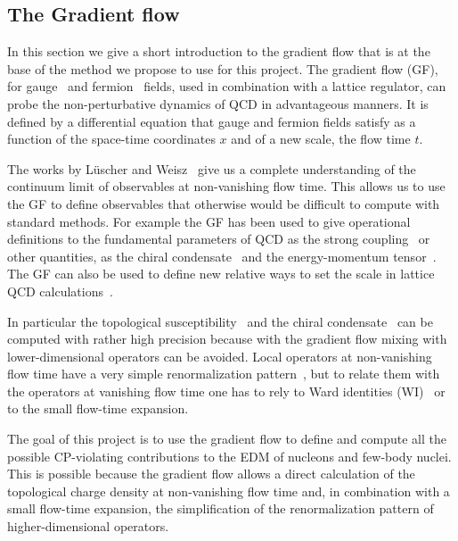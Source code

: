 \documentclass[aps,prc,twocolumn,showpacs,floatfix,nofootinbib,preprintnumbers,superscriptaddress,amsmath,amssymb]{revtex4-1}
\begin{document}
\subsection{The Gradient flow}

In this section we give a short introduction to the gradient flow that is at the base of the
method we propose to use for this project.
The gradient flow (GF), for gauge~\cite{Luscher:2010iy} 
and fermion~\cite{Luscher:2013cpa} fields, used in combination with a lattice regulator, 
can probe the non-perturbative dynamics of QCD
in advantageous manners.
It is defined by a differential equation that gauge and fermion
fields satisfy as a function of the space-time coordinates $x$ and of a new
scale, the flow time $t$.

The works by L\"uscher and Weisz~\cite{Luscher:2010iy,Luscher:2011bx,Luscher:2013cpa}
give us a complete understanding of the continuum limit
of observables at non-vanishing flow time. This allows us to use the GF
to define observables that otherwise would be difficult
to compute with standard methods.
For example the GF has been used to give operational definitions to the
fundamental parameters of QCD as the strong coupling~\cite{Luscher:2010iy,Fodor:2012td,Fritzsch:2013je}
or other quantities, as the chiral condensate~\cite{Luscher:2013cpa}
and the energy-momentum tensor~\cite{Suzuki:2013gza,DelDebbio:2013zaa}.
The GF can also be used to define new relative ways to set the scale in 
lattice QCD calculations~\cite{Luscher:2010iy,Borsanyi:2012zs}.

In particular the topological susceptibility~\cite{Luscher:2010iy} and the chiral condensate~\cite{Luscher:2013cpa}
can be computed with rather high precision because with the gradient flow 
mixing with lower-dimensional operators can be avoided.
Local operators at non-vanishing flow time have a very simple renormalization pattern~\cite{Luscher:2010iy,Luscher:2011bx,Luscher:2013cpa},
but to relate them with the operators at vanishing flow time one has to rely to 
Ward identities (WI)~\cite{Luscher:2013cpa,DelDebbio:2013zaa,Shindler:2013bia} or to the small flow-time expansion.

The goal of this project is to use the gradient flow to define and compute all the 
possible CP-violating contributions to the EDM of nucleons and few-body nuclei.
This is possible because the gradient flow allows 
a direct calculation of the topological charge density at non-vanishing flow time
and, in combination with a small flow-time expansion, the simplification
of the renormalization pattern of higher-dimensional operators. 
\end{document}
